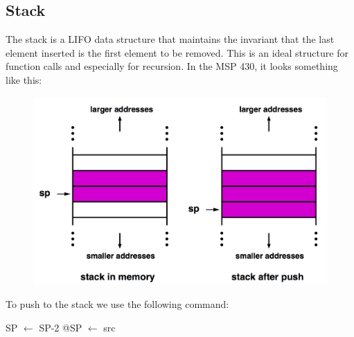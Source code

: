 \documentclass{hw}
\begin{document}
\subsection{Stack}
The stack is a LIFO data structure that maintains the invariant that the last 
element inserted is the first element to be removed. This is an ideal structure
for function calls and especially for recursion. In the MSP 430, it looks something
like this:
\begin{figure}[H]
  \centering
  \includegraphics[scale=.4]{img/stack}
\end{figure}
To push to the stack we use the following command:
\begin{C}
  SP $\leftarrow$ SP-2
  @SP $\leftarrow$ src
\end{C}
\end{document}
